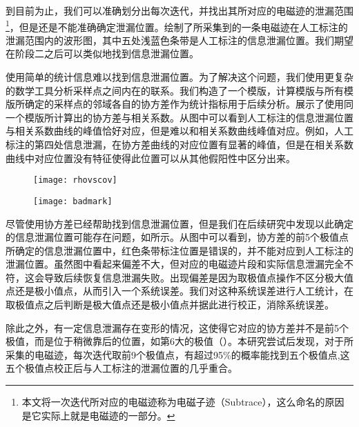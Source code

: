 {	到目前为止，我们可以准确划分出每次迭代，并找出其所对应的电磁迹的泄漏范围\footnote{本文将一次迭代所对应的电磁迹称为电磁子迹（Subtrace），这么命名的原因是它实际上就是电磁迹的一部分。}，但是还是不能准确确定泄漏位置。绘制了所采集到的一条电磁迹在人工标注的泄漏范围内的波形图，其中五处浅蓝色条带是人工标注的信息泄漏位置。我们期望在阶段二之后可以类似地找到信息泄漏位置。
	
	使用简单的统计信息难以找到信息泄漏位置。为了解决这个问题，我们使用更复杂的数学工具分析采样点之间内在的联系。我们构造了一个模版，计算模版与所有模版所确定的采样点的邻域各自的协方差作为统计指标用于后续分析。展示了使用同一个模版所计算出的协方差与相关系数。从图中可以看到人工标注的信息泄漏位置与相关系数曲线的峰值恰好对应，但是难以和相关系数曲线峰值对应。例如，人工标注的第四处信息泄漏，在协方差曲线的对应位置有显著的峰值，但是在相关系数曲线中对应位置没有特征使得此位置可以从其他假阳性中区分出来。
	
	\begin{figure}[!h]
		\begin{center}
			\texttt{[image: rhovscov]}
			\label{fig:rhovscov}
		\end{center}
	\end{figure}

	\begin{figure}[!h]
		\begin{center}
			\texttt{[image: badmark]}
			\label{fig:badmark}
		\end{center}
	\end{figure}
	
	尽管使用协方差已经帮助找到信息泄漏位置，但是我们在后续研究中发现以此确定的信息泄漏位置可能存在问题，如所示。从图中可以看到，协方差的前5个极值点所确定的信息泄漏位置中，红色条带标注位置是错误的，并不能对应到人工标注的泄漏位置。虽然图中看起来偏差不大，但对应的电磁迹片段和实际信息泄漏完全不符，这会导致后续恢复信息泄漏失败。出现偏差是因为取极值点操作不区分极大值点还是极小值点，从而引入一个系统误差。我们对这种系统误差进行人工统计，在取极值点之后判断是极大值点还是极小值点并据此进行校正，消除系统误差。
	
	除此之外，有一定信息泄漏存在变形的情况，这使得它对应的协方差并不是前5个极值，而是位于稍微靠后的位置，如第6大的极值（）。本研究尝试后发现，对于所采集的电磁迹，每次迭代取前9个极值点，有超过95\%的概率能找到五个极值点,这五个极值点校正后与人工标注的泄漏位置的几乎重合。
	
}
